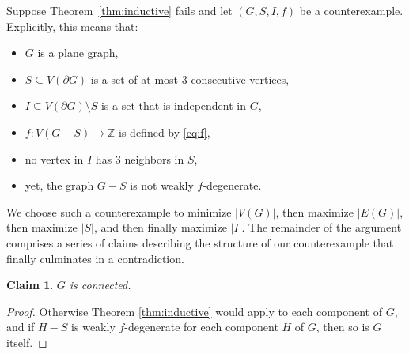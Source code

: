 \documentclass[11pt]{article}
\theoremstyle{slantthm}
\newtheorem{claim}{Claim}%
\numberwithin{equation}{section}
\theoremstyle{definition}
\renewcommand{\geq}{\geqslant}
\newcommand{\defeq}{\coloneqq}
\numberwithin{equation}{section}
\newcommand{\N}{\mathbb{N}}
\newcommand{\Z}{\mathbb{Z}}
\newcommand{\0}{\varnothing}
\newcommand{\bdry}[1]{{\partial #1}}
\newcommand\eve[1]{{\color{nicelavender}{#1}}}
\newcommand\eugene[1]{{\color{xkcd_fern}{#1}}}
\begin{document}
Suppose Theorem~\ref{thm:inductive} fails and let $(G,S,I,f)$ be a counterexample. %
Explicitly, this means that:
\begin{itemize}
    \item $G$ is a plane graph, %
    \item $S \subseteq V(\bdry{G})$ is a set of at most $3$ consecutive vertices,
    \item $I \subseteq V(\bdry{G}) \setminus S$ is a set that is independent in $G$,
    \item $f \colon V(G - S) \to \Z$ is defined by \eqref{eq:f}, %
    \item %
    no vertex in $I$ has $3$ neighbors in $S$,
    \item yet, the graph $G - S$ is not weakly $f$-degenerate.
\end{itemize}
We choose such a counterexample to minimize $|V(G)|$, then maximize $|E(G)|$, then maximize $|S|$, and then finally maximize $|I|$. %
The remainder of the argument comprises a series of claims describing the structure of our counterexample that finally culminates in a contradiction.


\begin{claim}
    $G$ is connected.
\end{claim}
\begin{proof}
    Otherwise Theorem \ref{thm:inductive} would apply to each component of $G$, and if $H-S$ is weakly $f$-degenerate for each component $H$ of $G$, then so is $G$ itself.
\end{proof}
\end{document}
